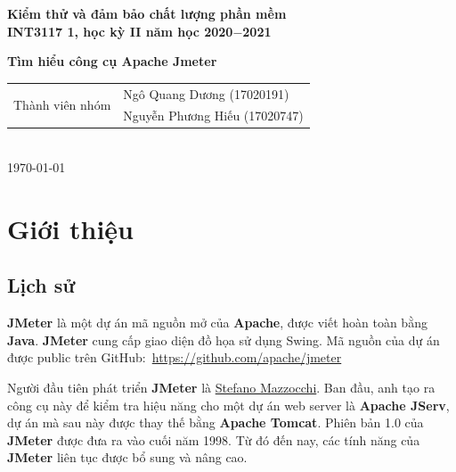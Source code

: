 \documentclass[10pt]{report}
\newcommand{\jmeter}{\textbf{JMeter}}
\newcommand{\apache}{\textbf{Apache}}
\newcommand{\java}{\textbf{Java}}
\begin{document}
\begin{titlepage}

    \begin{center}
        \vfill
        {\LARGE\bf Kiểm thử và đảm bảo chất lượng phần mềm} \\
        {\Large\bf INT3117 1, học kỳ II năm học 2020$-$2021} \\
        \bigskip
        \bigskip

        \bigskip
        {\Huge\bf Tìm hiểu công cụ Apache Jmeter}
        \bigskip

        \bigskip
        \bigskip

        \begin{tabular}{c|l}
            \multirow{2}{*}{Thành viên nhóm} & Ngô Quang Dương (17020191) \\
            & Nguyễn Phương Hiếu (17020747) \\
        \end{tabular} \\
        \medskip
        {\today}
        \vfill
    \end{center}
\end{titlepage}

\tableofcontents

\chapter{Giới thiệu}

\section{Lịch sử}

\par \jmeter{} là một dự án mã nguồn mở của \apache{}, được viết hoàn toàn bằng \java{}. \jmeter{} cung cấp giao diện đồ họa sử dụng Swing. Mã nguồn của dự án được public trên GitHub:~\url{https://github.com/apache/jmeter}

\par Người đầu tiên phát triển \jmeter{} là \href{https://www.linkedin.com/in/stefanom}{Stefano Mazzocchi}. Ban đầu, anh tạo ra công cụ này để kiểm tra hiệu năng cho một dự án web server là \textbf{Apache JServ}, dự án mà sau này được thay thế bằng \textbf{Apache Tomcat}. Phiên bản 1.0 của \jmeter{} được đưa ra vào cuối năm 1998. Từ đó đến nay, các tính năng của \jmeter{} liên tục được bổ sung và nâng cao.
\end{document}
